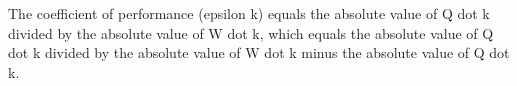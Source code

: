 The coefficient of performance (epsilon k) equals the absolute value of Q dot k divided by the absolute value of W dot k, which equals the absolute value of Q dot k divided by the absolute value of W dot k minus the absolute value of Q dot k.